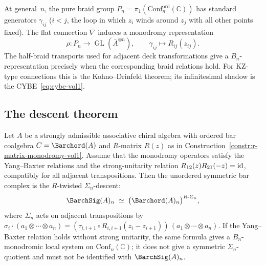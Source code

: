 \begin{construction}
At general~$n$, the pure braid group
$P_n=\pi_1(\mathrm{Conf}_n^{\mathrm{ord}}(\mathbb{C}))$
has standard generators $\gamma_{ij}$ ($i<j$, the loop in which $z_i$
winds around $z_j$ with all other points fixed). The flat connection
$\nabla$ induces a monodromy representation
\[
\rho\colon P_n\to\operatorname{GL}(\bar A^{\otimes n}),
\qquad
\gamma_{ij}\mapsto R_{ij}(z_{ij}).
\]
The half-braid transports used for adjacent deck transformations give a
$B_n$-representation precisely when the corresponding braid relations
hold. For KZ-type connections this is the Kohno--Drinfeld theorem; its
infinitesimal shadow is the CYBE~\eqref{eq:cybe-vol1}.
\end{construction}

\subsection*{The descent theorem}

\begin{proposition}
\ClaimStatusProvedHere
\label{prop:r-matrix-descent-vol1}
\label{sec:r-matrix-descent-vol1}
\label{lem:R-twisted-descent}
Let $A$ be a strongly admissible associative chiral algebra with
ordered bar coalgebra $C=\Barchord(A)$ and
$R$-matrix $R(z)$ as in
Construction~\textup{\ref{constr:r-matrix-monodromy-vol1}}.
Assume that the monodromy operators satisfy the Yang--Baxter
relations and the strong-unitarity relation
$R_{12}(z)R_{21}(-z)=\mathrm{id}$, compatibly for all adjacent
transpositions. Then the unordered symmetric bar complex is the
$R$-twisted $\Sigma_n$-descent:
\begin{equation}\label{eq:descent-identification-vol1}
\BarchSig(A)_n
\;\simeq\;
\bigl(\Barchord(A)_n\bigr)^{R\text{-}\Sigma_n},
\end{equation}
where $\Sigma_n$ acts on adjacent transpositions by
$\sigma_i\cdot(a_1\otimes\cdots\otimes a_n)
=(\tau_{i,i+1}\circ R_{i,i+1}(z_i{-}z_{i+1}))\,
(a_1\otimes\cdots\otimes a_n)$.
If the Yang--Baxter relation holds without strong unitarity, the same
formula gives a $B_n$-monodromic local system on
$\mathrm{Conf}_n(\mathbb C)$; it does not give a symmetric
$\Sigma_n$-quotient and must not be identified with $\BarchSig(A)_n$.
\end{proposition}

